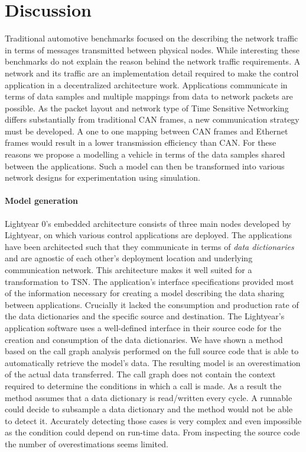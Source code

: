 \section{Discussion}
\label{sec:discussion}
Traditional automotive benchmarks focused on the describing the network traffic in terms of messages transmitted between physical nodes. While interesting these benchmarks do not explain the reason behind the network traffic requirements. A network and its traffic are an implementation detail required to make the control application in a decentralized architecture work. Applications communicate in terms of data samples and multiple mappings from data to network packets are possible. As the packet layout and network type of Time Sensitive Networking differs substantially from traditional CAN frames, a new communication strategy must be developed. A one to one mapping between CAN frames and Ethernet frames would result in a lower transmission efficiency than CAN. For these reasons we propose a modelling a vehicle in terms of the data samples shared between the applications. Such a model can then be transformed into various network designs for experimentation using simulation.

\paragraph{Model generation}
Lightyear 0's embedded architecture consists of three main nodes developed by Lightyear, on which various control applications are deployed. The applications have been architected such that they communicate in terms of \textit{data dictionaries} and are agnostic of each other's deployment location and underlying communication network. This architecture makes it well suited for a transformation to TSN. The application's interface specifications provided most of the information necessary for creating a model describing the data sharing between applications. Crucially it lacked the consumption and production rate of the data dictionaries and the specific source and destination. The Lightyear's application software uses a well-defined interface in their source code for the creation and consumption of the data dictionaries. We have shown a method based on the call graph analysis performed on the full source code that is able to automatically retrieve the model's data. The resulting model is an overestimation of the actual data transferred. The call graph does not contain the context required to determine the conditions in which a call is made. As a result the method assumes that a data dictionary is read/written every cycle. A runnable could decide to subsample a data dictionary and the method would not be able to detect it. Accurately detecting those cases is very complex and even impossible as the condition could depend on run-time data. From inspecting the source code the number of overestimations seems limited. 

